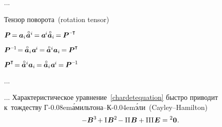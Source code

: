 \begin{otherlanguage}{russian}
...

Тензор поворота~(rotation tensor)

$\bm{P} \hspace{-0.2ex} = \hspace{-0.1ex} \bm{a}_i \hspace{.1ex} \mathcircabove{\bm{a}}^i \hspace{-0.2ex} = \hspace{-0.1ex} \bm{a}^{\hspace{-0.16ex}i} \mathcircabove{\bm{a}}_i \hspace{-0.2ex} = \hspace{-0.1ex} \bm{P}^{\expminusT}$

$\bm{P}^{\expminusone} \hspace{-0.4ex} = \hspace{-0.1ex} \mathcircabove{\bm{a}}_i \hspace{.1ex} \bm{a}^{\hspace{-0.16ex}i} \hspace{-0.2ex} = \hspace{-0.1ex} \mathcircabove{\bm{a}}^i \bm{a}_i \hspace{-0.2ex} = \hspace{-0.1ex} \bm{P}^{\T}$

$\bm{P}^{\T} \hspace{-0.4ex} = \hspace{-0.1ex} \mathcircabove{\bm{a}}^i \bm{a}_i \hspace{-0.2ex} = \hspace{-0.1ex} \mathcircabove{\bm{a}}_i \hspace{.1ex} \bm{a}^{\hspace{-0.16ex}i} \hspace{-0.2ex} = \hspace{-0.1ex} \bm{P}^{\expminusone}$

...



... Характеристическое уравнение~\eqref{chardetequation} быстро приводит к~тождеству Г\kern-0.08em\'{а}мильтона\hbox{--}К\kern-0.04em\'{э}ли~(Cayley\hbox{--}Hamilton)
\nopagebreak\vspace{.1em}\begin{equation}\label{cayley-hamilton:eq}
-\bm{B}^{3} \hspace{-0.25ex} + \mathrm{I}\hspace{0.16ex} \bm{B}^{2} \hspace{-0.25ex} - \mathrm{II}\hspace{0.16ex} \bm{B} + \mathrm{III}\hspace{0.16ex} \bm{E} = {^2\bm{0}} \hspace{0.1ex}.
\end{equation}

\end{otherlanguage}

